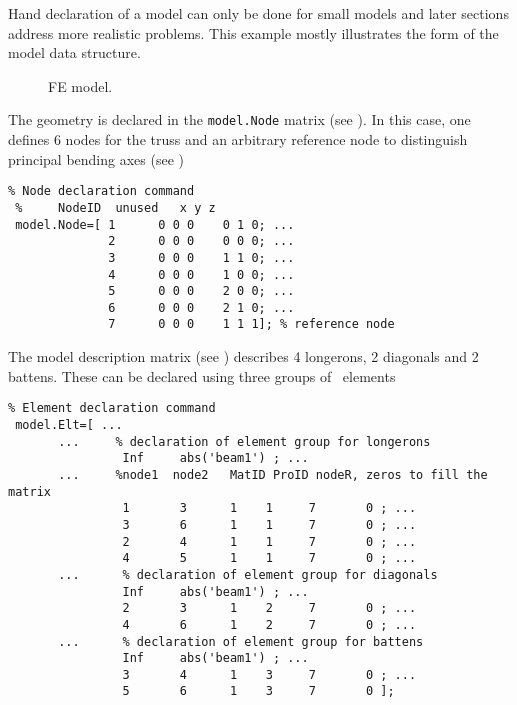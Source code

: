 
Hand declaration of a model can only be done for small models and later sections address more realistic problems. This example mostly illustrates the form of the model data structure. 

\begin{figure}[hbt]
\centering
{} %
 \caption{FE model.}
  \label{fig:tt_2bay}
\end{figure}

The geometry is declared in the {\tt model.Node} matrix (see ). In this case, one defines 6 nodes for the truss and an arbitrary reference node to distinguish principal bending axes (see \beam)

\begin{verbatim}
% Node declaration command
 %     NodeID  unused   x y z
 model.Node=[ 1      0 0 0    0 1 0; ...
              2      0 0 0    0 0 0; ...
              3      0 0 0    1 1 0; ...
              4      0 0 0    1 0 0; ...
              5      0 0 0    2 0 0; ...
              6      0 0 0    2 1 0; ...
              7      0 0 0    1 1 1]; % reference node
\end{verbatim}%


The model description matrix (see ) describes 4 longerons, 2 
diagonals and 2 battens. These can be declared using three groups
of \beam\ elements

\begin{verbatim}
% Element declaration command
 model.Elt=[ ...
       ...     % declaration of element group for longerons
                Inf     abs('beam1') ; ...
       ...     %node1  node2   MatID ProID nodeR, zeros to fill the matrix 
                1       3      1    1     7       0 ; ...
                3       6      1    1     7       0 ; ...
                2       4      1    1     7       0 ; ...
                4       5      1    1     7       0 ; ...
       ...      % declaration of element group for diagonals
                Inf     abs('beam1') ; ...
                2       3      1    2     7       0 ; ...
                4       6      1    2     7       0 ; ...
       ...      % declaration of element group for battens
                Inf     abs('beam1') ; ...
                3       4      1    3     7       0 ; ...
                5       6      1    3     7       0 ];
\end{verbatim}%


